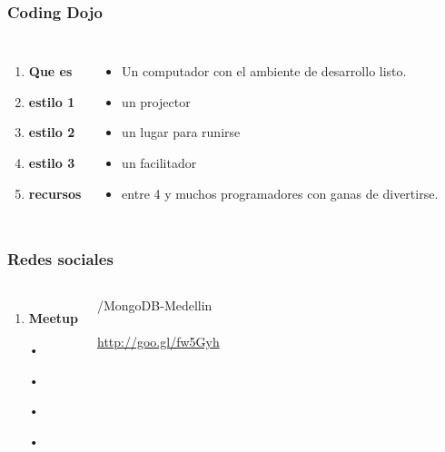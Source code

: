 \documentclass{beamer}
\begin{document}
\begin{frame}
\frametitle{Coding Dojo}
\begin{columns}[c] %

\begin{enumerate}
\item \textbf{Que es}
\item \textbf{estilo 1}
\item \textbf{estilo 2}
\item \textbf{estilo 3}
\item \textbf{recursos}
\end{enumerate}

\begin{itemize}
\item Un computador con el ambiente de desarrollo listo. 
\item un projector 
\item un lugar para runirse
\item un facilitador
\item entre 4 y muchos programadores con ganas de divertirse.
\end{itemize}
\end{columns}
\end{frame}
\begin{frame}
\frametitle{Redes sociales}
\begin{columns}[c] %

\begin{enumerate}
\item \textbf{Meetup}
\item[•]	
\item[•]	
\item[•]	
\item[•]	
\end{enumerate}

{\color{blue}/MongoDB-Medellin}
\\~\\
{\color{blue}\url{http://goo.gl/fw5Gyh}}
\end{columns}
\end{frame}
\end{document}

